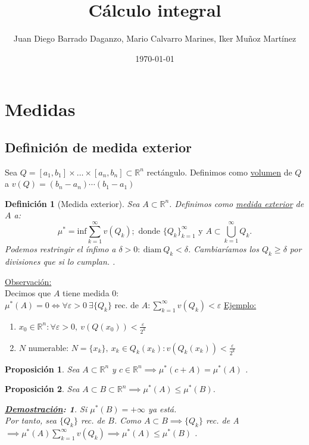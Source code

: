 \documentclass[10pt,a4paper,openright]{book}
\title{Cálculo integral}
\author{Juan Diego Barrado Daganzo, Mario Calvarro Marines, Iker Muñoz Martínez}
\date{\today}
\theoremstyle{break}
\newtheorem*{defi}{Definición}
\newtheorem*{prop}{Proposición}
\newtheorem*{demo}{\underline{Demostración}:}
\begin{document}
\maketitle
\chapter*{Medidas}%
\label{sec:medidas}
\section*{Definición de medida exterior}%
\label{sub:definicion_de_medida_exterior}
Sea $Q = \left[ a_1, b_1 \right] \times \ldots \times \left[ a_n, b_n \right] \subset \mathbb{R}^{n}$ rectángulo. 
Definimos como \underline{volumen} de $Q$ a $v\left( Q \right) = \left( b_n - a_n \right) \cdots \left( b_1 - a_1 \right)$ 
\begin{defi}[Medida exterior]
   Sea $A \subset \mathbb{R}^{n}$. Definimos como \underline{medida exterior} de $A$ a: \[
   \mu^{*} = \mathrm{inf}\sum_{k=1}^{\infty} v\left( Q_k \right); \text{ donde } \{Q_k\}_{k=1}^{\infty} \text{ y } A \subset \bigcup_{k = 1}^{\infty} Q_k
   .\]  
Podemos restringir el ínfimo a $\delta > 0: \ \mathrm{diam}\ Q_k < \delta$. Cambiaríamos los $Q_k \ge  \delta$ por divisiones que si lo cumplan.
.\end{defi}

\underline{Observación:}\\
Decimos que $A$ tiene medida $0$: $\mu^{*}\left( A \right) = 0 \iff \forall \varepsilon > 0 \ \exists \{Q_k\} \text{ rec. de } A: \sum_{k=1}^{\infty} v\left( Q_k \right) < \varepsilon$     
    \underline{Ejemplo:}
    \begin{enumerate}
       \item $x_0 \in \mathbb{R}^{n}: \forall \varepsilon > 0, \ v\left( Q\left( x_0 \right)  \right) < \frac{\varepsilon}{2^{k}}$
       \item $N$ numerable: $N = \{x_k\}, \ x_k \in Q_k\left( x_k \right): v\left( Q_k\left( x_k \right)  \right) < \frac{\varepsilon}{2^{k}}$
    \end{enumerate}
    
\begin{prop}
   Sea $A \subset \mathbb{R}^{n}$ y $c \in \mathbb{R}^{n} \implies \mu^{*}\left( c + A \right) = \mu^{*}\left( A \right) $   
.\end{prop}
\begin{prop}
   Sea $A \subset B \subset \mathbb{R}^{n} \implies \mu^{*}\left( A \right) \le \mu^{*}\left( B \right) $.
   \begin{demo}
       Si $\mu^{*}\left( B \right) = +\infty$ ya está.\\
       Por tanto, sea $\{Q_k\}$ rec. de $B$. Como $A \subset B \implies \{Q_k\}$ rec. de A $\implies \mu^{*}\left( A \right)
       \sum_{k=1}^{\infty} v\left( Q_k \right) \implies \mu^{*}\left( A \right) \le \mu^{*}\left( B \right) $
   .\end{demo}
\end{prop}
\end{document}
